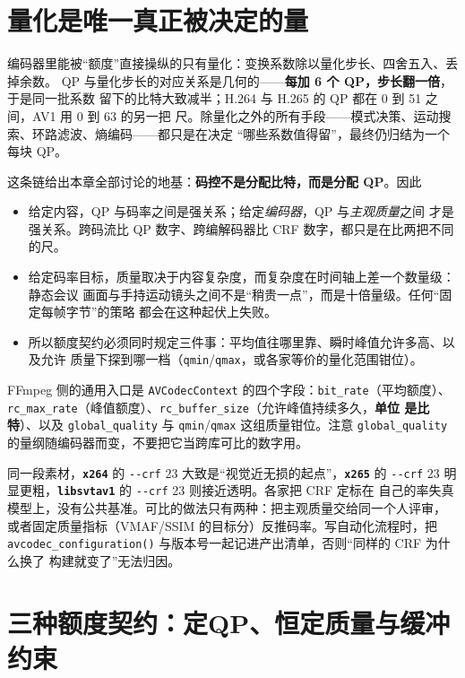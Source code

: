 \documentclass[12pt,a4paper,fontset=fandol]{ctexbook}
\newcommand{\Fn}[1]{\texttt{#1()}}
\newcommand{\Tp}[1]{\texttt{#1}}
\newcommand{\Opt}[1]{\texttt{-\/-#1}}
\newcommand{\Bk}{\discretionary{}{}{}}
\newcommand{\Lib}[1]{\textbf{\texttt{#1}}}
\begin{document}
\section{量化是唯一真正被决定的量}

编码器里能被``额度''直接操纵的只有量化：变换系数除以量化步长、四舍五入、丢掉余数。
QP 与量化步长的对应关系是几何的——\textbf{每加 6 个 QP，步长翻一倍}，于是同一批系数
留下的比特大致减半；H.264 与 H.265 的 QP 都在 0 到 51 之间，AV1 用 0 到 63 的另一把
尺。除量化之外的所有手段——模式决策、运动搜索、环路滤波、熵编码——都只是在决定
``哪些系数值得留''，最终仍归结为一个每块 QP。

这条链给出本章全部讨论的地基：\textbf{码控不是分配比特，而是分配 QP}。因此

\begin{itemize}
\item 给定内容，QP 与码率之间是强关系；给定\emph{编码器}，QP 与\emph{主观质量}之间
  才是强关系。跨码流比 QP 数字、跨编解码器比 CRF 数字，都只是在比两把不同的尺。
\item 给定码率目标，质量取决于内容复杂度，而复杂度在时间轴上差一个数量级：静态会议
  画面与手持运动镜头之间不是``稍贵一点''，而是十倍量级。任何``固定每帧字节''的策略
  都会在这种起伏上失败。
\item 所以额度契约必须同时规定三件事：平均值往哪里靠、瞬时峰值允许多高、以及允许
  质量下探到哪一档（\Tp{qmin}/{\Bk}\Tp{qmax}，或各家等价的量化范围钳位）。
\end{itemize}

FFmpeg 侧的通用入口是 \Tp{AVCodecContext} 的四个字段：\Tp{bit\_rate}（平均额度）、
\Tp{rc\_max\_rate}（峰值额度）、\Tp{rc\_buffer\_size}（允许峰值持续多久，\textbf{单位
是比特}）、以及 \Tp{global\_quality} 与 \Tp{qmin}/{\Bk}\Tp{qmax} 这组质量钳位。注意
\Tp{global\_quality} 的量纲随编码器而变，不要把它当跨库可比的数字用。

\begin{warning}[title={QP、CRF 与全局质量是三把尺，不能拿数字对话}]
同一段素材，\Lib{x264} 的 \Opt{crf} 23 大致是``视觉近无损的起点''，\Lib{x265} 的
\Opt{crf} 23 明显更粗，\Lib{libsvtav1} 的 \Opt{crf} 23 则接近透明。各家把 CRF 定标在
自己的率失真模型上，没有公共基准。可比的做法只有两种：把主观质量交给同一个人评审，
或者固定质量指标（VMAF/SSIM 的目标分）反推码率。写自动化流程时，把
\Fn{avcodec\_configuration} 与版本号一起记进产出清单，否则``同样的 CRF 为什么换了
构建就变了''无法归因。
\end{warning}

\section{三种额度契约：定QP、恒定质量与缓冲约束}
\end{document}

